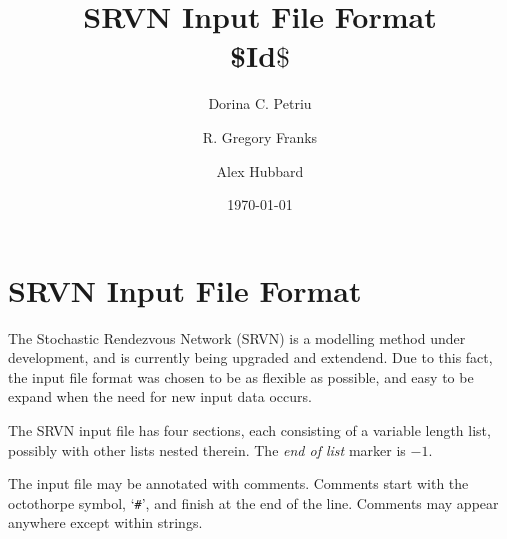 \documentclass{article}
\begin{document}
\title{SRVN Input File Format\\ {\small\rm\$Id$\$$}}
\author {Dorina C. Petriu \and R. Gregory Franks \and Alex Hubbard}
\date{\today} 
\maketitle

\section{SRVN Input File Format}
The Stochastic Rendezvous Network (SRVN) is a modelling method under
development, and is currently being upgraded and extendend. Due to
this fact, the input file format was chosen to be as flexible as
possible, and easy to be expand when the need for new input data
occurs.

The SRVN input file has four sections, each consisting of a variable
length list, possibly with other lists nested therein.  The {\em end
of list} marker is $-1$.

The input file may be annotated with comments.
Comments start with the octothorpe symbol, `{\tt \#}', and finish at the
end of the line.  Comments may appear anywhere except within strings.
\end{document}
